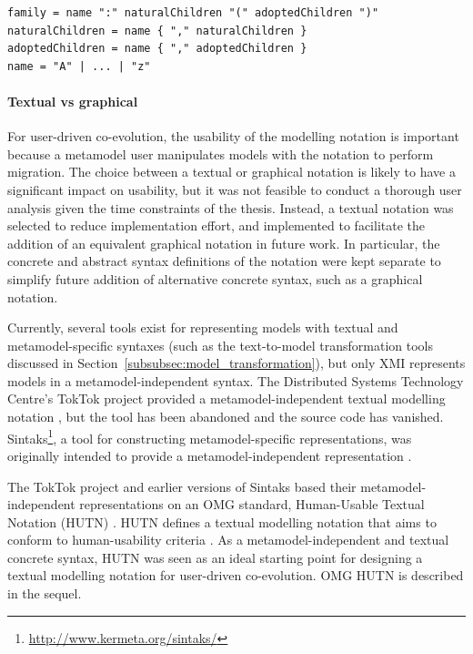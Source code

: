 \begin{lstlisting}[caption=A metamodel-specific syntax for families in EBNF, label=lst:mms_syntax, language=EBNF]
family = name ":" naturalChildren "(" adoptedChildren ")"
naturalChildren = name { "," naturalChildren }
adoptedChildren = name { "," adoptedChildren }
name = "A" | ... | "z"
\end{lstlisting}

\paragraph{Textual vs graphical} For user-driven co-evolution, the usability of the modelling notation is important because a metamodel user manipulates models with the notation to perform migration. The choice between a textual or graphical notation is likely to have a significant impact on usability, but it was not feasible to conduct a thorough user analysis given the time constraints of the thesis. Instead, a textual notation was selected to reduce implementation effort, and implemented to facilitate the addition of an equivalent graphical notation in future work. In particular, the concrete and abstract syntax definitions of the notation were kept separate to simplify future addition of alternative concrete syntax, such as a graphical notation.

Currently, several tools exist for representing models with textual and metamodel-specific syntaxes (such as the text-to-model transformation tools discussed in Section~\ref{subsubsec:model_transformation}), but only XMI represents models in a metamodel-independent syntax. The \cc Distributed Systems Technology Centre's TokTok project provided a me\-ta\-mo\-del-inde\-pe\-nd\-ent textual modelling notation \cite{steel01hutn}, but the tool has been abandoned and the source code has vanished. Sintaks\footnote{\url{http://www.kermeta.org/sintaks/}}, \cc a tool for constructing metamodel-specific representations, was originally intended to provide a me\-ta\-mo\-del-inde\-pe\-nd\-ent representation \cite{muller05hutn}.

The \cc TokTok project and earlier versions of Sintaks based their me\-ta\-mo\-del-ind\-ep\-en\-de\-nt representations on an OMG standard, Human-Usable Textual Notation (HUTN) \cite{steel01hutn,muller05hutn}. HUTN defines a textual modelling notation that aims to conform to human-usability criteria \cite{hutn}. As a me\-ta\-mo\-del-inde\-pe\-nd\-ent and textual concrete syntax, HUTN was seen as an ideal starting point for designing a textual modelling notation for user-driven co-evolution. OMG HUTN is described in the sequel.

